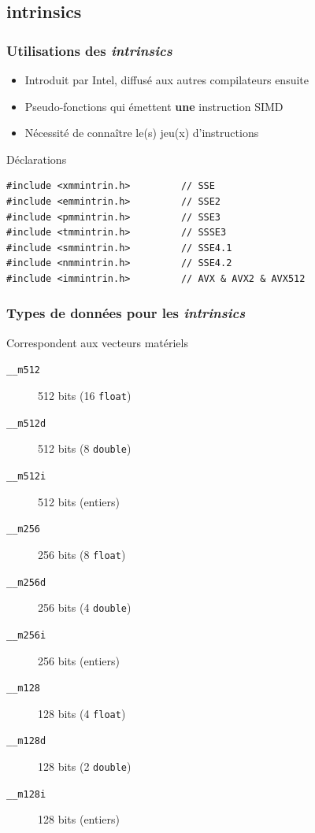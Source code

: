\documentclass[xcolor={x11names,svgnames}]{beamer}
\begin{document}
\subsection{intrinsics}

\begin{frame}[fragile=singleslide]
  \frametitle{Utilisations des \emph{intrinsics}}

  \begin{itemize}
  \item Introduit par Intel, diffusé aux autres compilateurs ensuite
  \item Pseudo-fonctions qui émettent \textbf{une} instruction SIMD
  \item Nécessité de connaître le(s) jeu(x) d'instructions
  \end{itemize}
  
  
\begin{block}{Déclarations}
  \begin{verbatim}
#include <xmmintrin.h>         // SSE
#include <emmintrin.h>         // SSE2
#include <pmmintrin.h>         // SSE3
#include <tmmintrin.h>         // SSSE3
#include <smmintrin.h>         // SSE4.1
#include <nmmintrin.h>         // SSE4.2
#include <immintrin.h>         // AVX & AVX2 & AVX512
\end{verbatim}
\end{block}

\end{frame}


\begin{frame}[fragile=singleslide]
  \frametitle{Types de données pour les \emph{intrinsics}}

\begin{block}{Correspondent aux \og vecteurs\fg{} matériels}
  
  \begin{description}
\item[\texttt{\_\_m512}] 512 bits (16 \texttt{float})
\item[\texttt{\_\_m512d}] 512 bits (8 \texttt{double})
\item[\texttt{\_\_m512i}] 512 bits (entiers)

  \item[\texttt{\_\_m256}] 256 bits (8 \texttt{float})
\item[\texttt{\_\_m256d}] 256 bits (4 \texttt{double})
\item[\texttt{\_\_m256i}] 256 bits (entiers)

\item[\texttt{\_\_m128}] 128 bits (4 \texttt{float})
\item[\texttt{\_\_m128d}] 128 bits (2 \texttt{double})
\item[\texttt{\_\_m128i}] 128 bits (entiers)
\end{description}
\end{block}
\end{frame}
\end{document}
